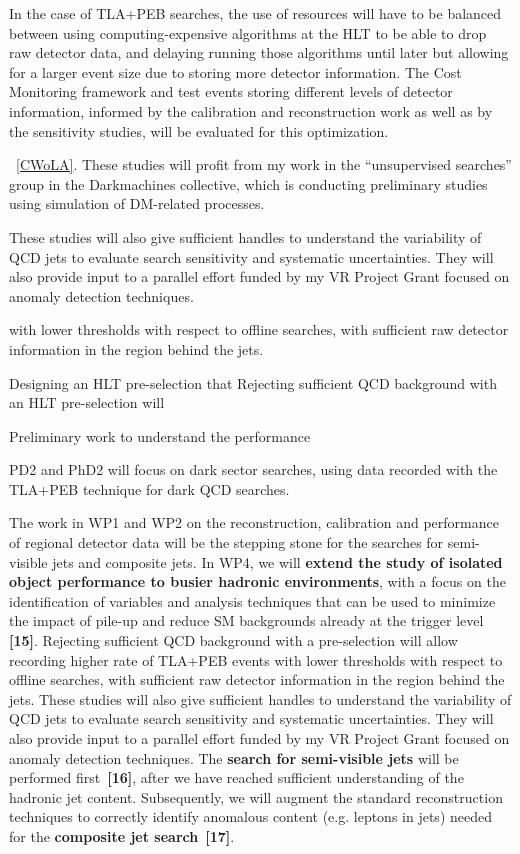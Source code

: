 In the case of TLA+PEB searches, the use of resources will have to be balanced between using computing-expensive algorithms at the HLT to be able to drop raw detector data, and delaying running those algorithms until later but allowing for a larger event size due to storing more detector information. The Cost Monitoring framework and test events storing different levels of detector information, informed by the calibration and reconstruction work as well as by the sensitivity studies, will be evaluated for this optimization. 


~\ref{CWoLA}. 
These studies will profit from my work in the “unsupervised searches” group in the  Darkmachines collective, which is conducting preliminary studies using simulation of DM-related processes. 




These studies will also give sufficient handles to understand the variability of QCD jets to evaluate search sensitivity and systematic uncertainties.
They will also provide input to a parallel effort funded by my VR Project Grant focused on anomaly detection techniques.  




 with lower thresholds with respect to offline searches, with sufficient raw detector information in the region behind the jets. 
 


Designing an HLT pre-selection that 
Rejecting sufficient QCD background with an HLT pre-selection will 

Preliminary work to understand the performance 





PD2 and PhD2 will focus on dark sector searches, using data recorded with the TLA+PEB technique for dark QCD searches. 

The work in WP1 and WP2 on the reconstruction, calibration and performance of regional detector data will be the stepping stone for the searches for semi-visible jets and composite jets. 
In WP4, we will \textbf{extend the study of isolated object performance to busier hadronic environments}, with a focus on the identification of variables and analysis techniques that can be used to minimize the impact of pile-up and reduce SM backgrounds already at the trigger level \textbf{[15]}. 
Rejecting sufficient QCD background with a pre-selection will allow recording higher rate of TLA+PEB events with lower thresholds with respect to offline searches, with sufficient raw detector information in the region behind the jets. 
These studies will also give sufficient handles to understand the variability of QCD jets to evaluate search sensitivity and systematic uncertainties.
They will also provide input to a parallel effort funded by my VR Project Grant focused on anomaly detection techniques.  
The \textbf{search for semi-visible jets} will be performed first~\textbf{[16]}, after we have reached sufficient understanding of the hadronic jet content. 
Subsequently, we will augment the standard reconstruction techniques to correctly identify anomalous content (e.g. leptons in jets) needed for the \textbf{composite jet search}~\textbf{[17]}.

